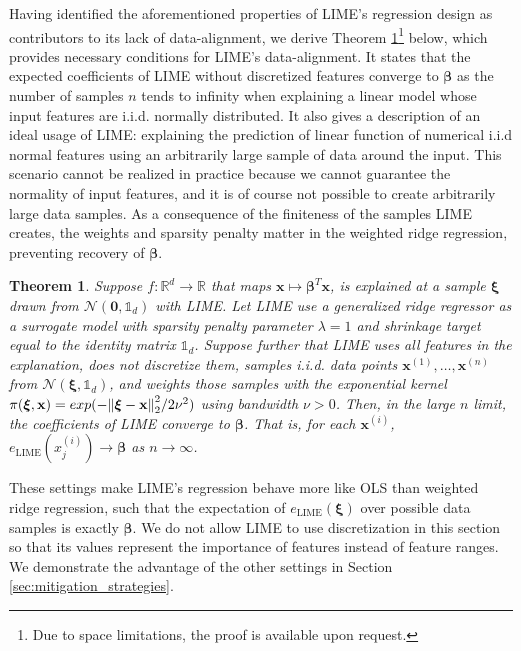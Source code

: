 \documentclass[12pt]{article}  %
\newtheorem{theorem}{Theorem}
\begin{document}
       Having identified the aforementioned properties of LIME's regression design as contributors to its lack of data-alignment, we derive Theorem \ref{thm:lime_thm}\footnote{Due to space limitations, the proof is available upon request.} below, which provides necessary conditions for LIME's data-alignment. It states that the expected coefficients of LIME without discretized features converge to $\boldsymbol{\beta}$ as the number of samples $n$ tends to infinity when explaining a linear model whose input features are i.i.d. normally distributed. It also gives a description of an ideal usage of LIME: explaining the prediction of linear function of numerical i.i.d normal features using an arbitrarily large sample of data around the input. This scenario cannot be realized in practice because we cannot guarantee the normality of input features, and it is of course not possible to create arbitrarily large data samples. As a consequence of the finiteness of the samples LIME creates, the weights and sparsity penalty matter in the weighted ridge regression, preventing recovery of $\boldsymbol{\beta}$.


      \begin{theorem}
        \label{thm:lime_thm}
        Suppose $f:\mathbb{R}^d\rightarrow \mathbb{R}$ that maps $\mathbf{x} \mapsto \boldsymbol{\beta}^T \mathbf{x}$, is explained at a sample $\boldsymbol{\xi}$ drawn from $\mathcal{N}(\mathbf{0}, \mathds{1}_d)$ with LIME. Let LIME use a generalized ridge regressor as a surrogate model with sparsity penalty parameter $\lambda=1$ and shrinkage target equal to the identity matrix $\mathds{1}_d$. Suppose further that LIME uses all features in the explanation, does not discretize them, samples i.i.d. data points $\mathbf{x}^{(1)},\ldots,\mathbf{x}^{(n)}$ from $ \mathcal{N}(\boldsymbol{\xi}, \mathds{1}_d)$, and weights those samples with the exponential kernel $\pi(\boldsymbol{\xi},\mathbf{x}) = exp(-\norm{\boldsymbol{\xi}-\mathbf{x}}_2^2/2\nu^2)$ using bandwidth $\nu>0$. Then, in the large $n$ limit, the coefficients of LIME converge to $\boldsymbol{\beta}$. That is, for each $\mathbf{x}^{(i)}$, $e_{\text{LIME}}(x^{(i)}_j) \rightarrow \boldsymbol{\beta}$
        as $n \rightarrow \infty$.
      \end{theorem}
       
       
       These settings make LIME's regression behave more like OLS than weighted ridge regression, such that the expectation of $e_{\text{LIME}}(\boldsymbol{\xi})$ over possible data samples is exactly $\boldsymbol{\beta}$. We do not allow LIME to use discretization in this section so that its values represent the importance of features instead of feature ranges. We demonstrate the advantage of the other settings in Section \ref{sec:mitigation_strategies}. 
 
\end{document}

